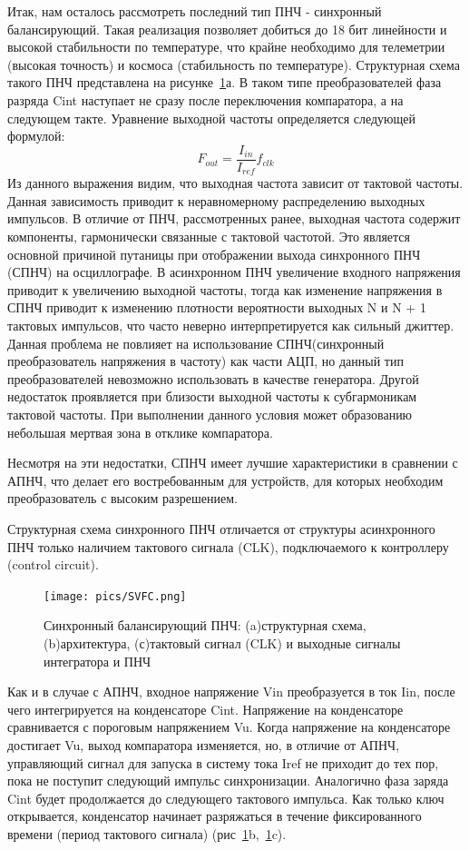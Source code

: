 \documentclass[a4paper,12pt,oneside]{scrartcl}
\begin{document}
Итак, нам осталось рассмотреть последний тип ПНЧ - синхронный балансирующий. 
Такая реализация позволяет добиться до 18 бит линейности и высокой стабильности по температуре, что крайне необходимо для телеметрии (высокая точность) и космоса (стабильность по температуре). Структурная схема такого ПНЧ представлена на рисунке~\ref{fig:svfc}а. В таком типе преобразователей фаза разряда Cint наступает не сразу после переключения компаратора, а на следующем такте. Уравнение выходной частоты определяется следующей формулой:
$$F_{out} = \frac{I_{in}}{I_{ref}}f_{clk}$$
Из данного выражения видим, что выходная частота зависит от тактовой частоты.
Данная зависимость приводит к неравномерному распределению выходных импульсов. В отличие от ПНЧ, рассмотренных ранее, выходная частота содержит компоненты, гармонически связанные с тактовой частотой. Это является основной причиной путаницы при отображении выхода синхронного ПНЧ (СПНЧ) на осциллографе. В асинхронном ПНЧ увеличение входного напряжения приводит к увеличению выходной частоты, тогда как изменение напряжения в СПНЧ приводит к изменению плотности вероятности выходных N и N + 1 тактовых импульсов, что часто неверно интерпретируется как сильный джиттер. Данная проблема не повлияет на использование СПНЧ(синхронный преобразователь напряжения в частоту) как части АЦП, но данный тип преобразователей невозможно использовать в качестве генератора. Другой недостаток проявляется при близости выходной частоты к субгармоникам тактовой частоты. При выполнении данного условия может образованию небольшая мертвая зона в отклике компаратора.

Несмотря на эти недостатки, СПНЧ имеет лучшие характеристики в сравнении с АПНЧ, что делает его востребованным для устройств, для которых необходим преобразователь с высоким разрешением. 

Структурная схема синхронного ПНЧ отличается от структуры асинхронного ПНЧ только наличием тактового сигнала (CLK), подключаемого к контроллеру (control circuit).

\begin{figure}[!htb]
    \centering
    \texttt{[image: pics/SVFC.png]}
    \caption{Синхронный балансирующий ПНЧ: (a)структурная схема, (b)архитектура, (с)тактовый сигнал (CLK) и выходные сигналы интегратора и ПНЧ}
    \label{fig:svfc}
\end{figure}

Как и в случае с АПНЧ, входное напряжение Vin преобразуется в ток Iin, после чего интегрируется на конденсаторе Cint. Напряжение на конденсаторе сравнивается с пороговым напряжением Vu. Когда напряжение на конденсаторе достигает Vu, выход компаратора изменяется, но, в отличие от АПНЧ, управляющий сигнал для запуска в систему тока Iref не приходит до тех пор, пока не поступит следующий импульс синхронизации. Аналогично фаза заряда Cint будет продолжается до следующего тактового импульса. Как только ключ открывается, конденсатор начинает разряжаться в течение фиксированного времени (период тактового сигнала) (рис~\ref{fig:svfc}b,~\ref{fig:svfc}c).~\cite{B3}
\end{document}
